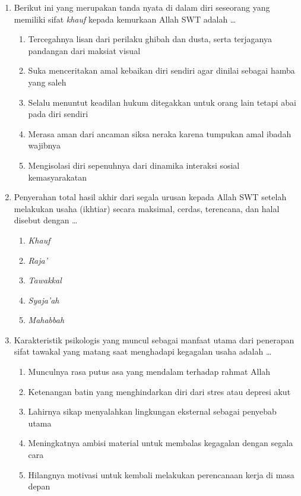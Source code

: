 \documentclass[12pt,a4paper]{article}
\begin{document}
\begin{enumerate}[leftmargin=*]
\item Berikut ini yang merupakan tanda nyata di dalam diri seseorang yang memiliki sifat \textit{khauf} kepada kemurkaan Allah SWT adalah \dots
    \begin{enumerate}[label=\alph*.]
        \item Tercegahnya lisan dari perilaku ghibah dan dusta, serta terjaganya pandangan dari maksiat visual
        \item Suka menceritakan amal kebaikan diri sendiri agar dinilai sebagai hamba yang saleh
        \item Selalu menuntut keadilan hukum ditegakkan untuk orang lain tetapi abai pada diri sendiri
        \item Merasa aman dari ancaman siksa neraka karena tumpukan amal ibadah wajibnya
        \item Mengisolasi diri sepenuhnya dari dinamika interaksi sosial kemasyarakatan
    \end{enumerate}

\item Penyerahan total hasil akhir dari segala urusan kepada Allah SWT setelah melakukan usaha (ikhtiar) secara maksimal, cerdas, terencana, dan halal disebut dengan \dots
    \begin{enumerate}[label=\alph*.]
        \item \textit{Khauf}
        \item \textit{Raja'}
        \item \textit{Tawakkal}
        \item \textit{Syaja'ah}
        \item \textit{Mahabbah}
    \end{enumerate}

\item Karakteristik psikologis yang muncul sebagai manfaat utama dari penerapan sifat tawakal yang matang saat menghadapi kegagalan usaha adalah \dots
    \begin{enumerate}[label=\alph*.]
        \item Munculnya rasa putus asa yang mendalam terhadap rahmat Allah
        \item Ketenangan batin yang menghindarkan diri dari stres atau depresi akut
        \item Lahirnya sikap menyalahkan lingkungan eksternal sebagai penyebab utama
        \item Meningkatnya ambisi material untuk membalas kegagalan dengan segala cara
        \item Hilangnya motivasi untuk kembali melakukan perencanaan kerja di masa depan
    \end{enumerate}


\end{enumerate}
\end{document}
